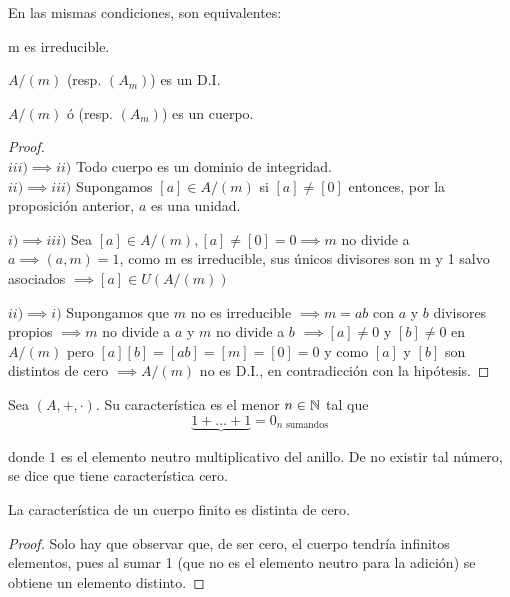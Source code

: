 \begin{ncor}
	En las mismas condiciones, son equivalentes:

	\begin{nlist}
	\item m es irreducible.
	\item $A/(m)$  (resp. $(A_m)$) es un D.I.
	\item $A/(m)$ ó (resp. $(A_m)$) es un cuerpo.
\end{nlist}
\end{ncor}
\begin{proof}\hfill \\
	$\boxed{iii) \implies ii)}$ Todo cuerpo es un dominio de integridad.\\
	$\boxed{ii) \implies iii)}$ Supongamos $[a] \in A/(m) $ si $[a] \ne [0]$ entonces, por la proposición anterior, $a$ es una unidad.

	$\boxed{i) \implies iii)}$ Sea $[a] \in A/(m), [a] \ne [0] = 0 \implies m$ no divide a $a \implies (a,m) = 1$, como m es irreducible, sus únicos divisores son m y 1 salvo asociados $\implies [a] \in U(A/(m))$

	$\boxed{ii)\implies i)}$ Supongamos que $m$ no es irreducible $\implies m = ab$ con $a$ y $b$ divisores propios $\implies m$ no divide a $a$ y $m$ no divide a $b$ $\implies [a] \ne 0 $ y $[b] \ne 0$ en $A/(m)$ pero $[a][b] = [ab] = [m] = [0] = 0$ y como $[a]$ y $[b]$ son distintos de cero $\implies A/(m)$ no es D.I., en contradicción con la hipótesis.
\end{proof}

\begin{ndef}
  Sea $(A, +, \cdot)$. Su característica es el menor $n \in \mathbb{N}$ tal que
  \[
     \underbrace{1 + \dots + 1} = 0_{n \text{ sumandos}}
  \]

   donde $1$ es el elemento neutro multiplicativo del anillo. De no existir tal número, se dice que tiene característica cero.
\end{ndef}

\begin{nprop}
  La característica de un cuerpo finito es distinta de cero.
\end{nprop}

\begin{proof}
  Solo hay que observar que, de ser cero, el cuerpo tendría infinitos elementos, pues al sumar 1 (que no es el elemento neutro para la adición) se obtiene un elemento distinto.
\end{proof}

